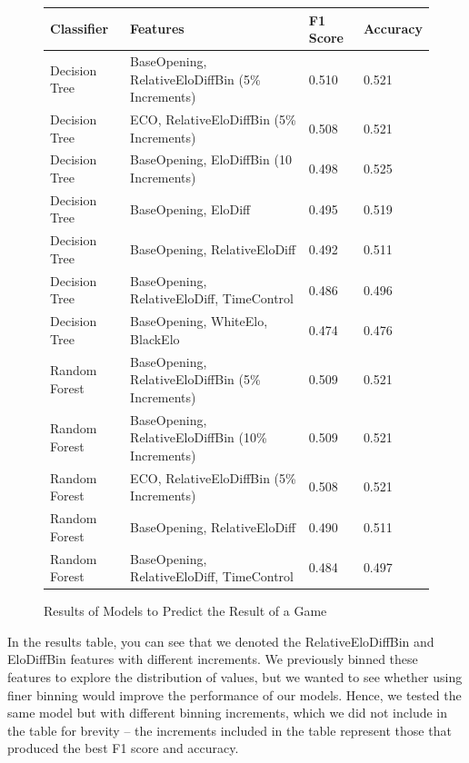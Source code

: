 \documentclass[a4paper, 11pt]{article}
\begin{document}
\begin{figure}[H]
    \centering
    \caption{Results of Models to Predict the Result of a Game}
    \label{fig:resultsOfModelsToPredictResultOfAGame}
    \begin{tabular}{| l | l | l | l |} 
        \hline
        \bf{Classifier} & \bf{Features} & \bf{F1 Score} & \bf{Accuracy} \\ [0.5ex] 
        \hline
        Decision Tree & BaseOpening, RelativeEloDiffBin (5\% Increments) & 0.510 & 0.521 \\
        \hline
        Decision Tree & ECO, RelativeEloDiffBin (5\% Increments) & 0.508 & 0.521 \\
        \hline
        Decision Tree & BaseOpening, EloDiffBin (10 Increments) & 0.498 & 0.525 \\
        \hline
        Decision Tree & BaseOpening, EloDiff & 0.495 & 0.519 \\
        \hline
        Decision Tree & BaseOpening, RelativeEloDiff & 0.492 & 0.511 \\
        \hline
        Decision Tree & BaseOpening, RelativeEloDiff, TimeControl & 0.486 & 0.496 \\
        \hline
        Decision Tree & BaseOpening, WhiteElo, BlackElo & 0.474 & 0.476 \\ 
        \hline
        Random Forest & BaseOpening, RelativeEloDiffBin (5\% Increments) & 0.509 & 0.521 \\ 
        \hline
        Random Forest & BaseOpening, RelativeEloDiffBin (10\% Increments) & 0.509 & 0.521 \\ 
        \hline
        Random Forest & ECO, RelativeEloDiffBin (5\% Increments) & 0.508 & 0.521 \\ 
        \hline
        Random Forest & BaseOpening, RelativeEloDiff & 0.490 & 0.511 \\ 
        \hline
        Random Forest & BaseOpening, RelativeEloDiff, TimeControl & 0.484 & 0.497 \\ 
        \hline
    \end{tabular}
\end{figure}

In the results table, you can see that we denoted the RelativeEloDiffBin and EloDiffBin features with different increments. We previously binned these features to explore the distribution of values, but we wanted to see whether using finer binning would improve the performance of our models. Hence, we tested the same model but with different binning increments, which we did not include in the table for brevity -- the increments included in the table represent those that produced the best F1 score and accuracy.
\end{document}
